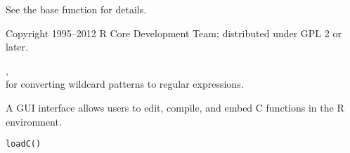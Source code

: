 \documentclass[letterpaper]{book}
\begin{document}
%
\begin{Details}\relax
See the base function  for details.
\end{Details}
%
\begin{Author}\relax
Copyright 1995--2012 R Core Development Team; distributed under GPL 2 or later.
\end{Author}
%
\begin{SeeAlso}\relax
{},  \\{}
 for converting wildcard patterns to regular expressions.
\end{SeeAlso}
%
\begin{Description}\relax
A GUI interface allows users to edit, compile, and embed C functions
in the R environment. 
\end{Description}
%
\begin{Usage}
\begin{verbatim}
loadC()
\end{verbatim}
\end{Usage}
%
\end{document}
